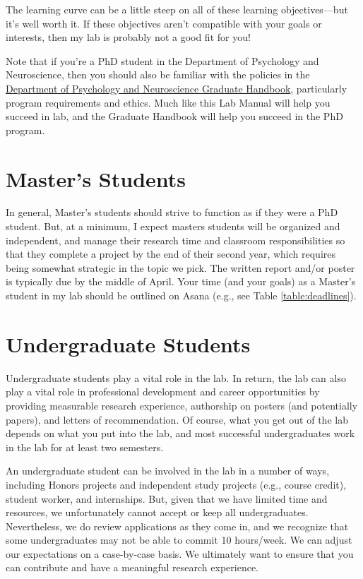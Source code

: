 \documentclass[letterpaper,11pt,oneside]{memoir}
\begin{document}
The learning curve can be a little steep on all of these learning objectives---but it's well worth it. If these objectives aren't compatible with your goals or interests, then my lab is probably not a good fit for you!

Note that if you're a PhD student in the Department of Psychology and Neuroscience, then you should also be familiar with the policies in the \href{https://docs.google.com/document/d/1hoxVN1ol7ZGB10_9N0k8yVxkRDJLcMVYGTp-Nwgbm94/edit}{Department of Psychology and Neuroscience Graduate Handbook}, particularly program requirements and ethics. Much like this Lab Manual will help you succeed in lab, and the Graduate Handbook will help you succeed in the PhD program.


\section{Master's Students}

In general, Master's students should strive to function as if they were a PhD student. But, at a minimum, I expect masters students will be organized and independent, and manage their research time and classroom responsibilities so that they complete a project by the end of their second year, which requires being somewhat strategic in the topic we pick. The written report and/or poster is typically due by the middle of April. Your time (and your goals) as a Master's student in my lab should be outlined on Asana (e.g., see Table \ref{table:deadlines}).

\section{Undergraduate Students}

Undergraduate students play a vital role in the lab. In return, the lab can also play a vital role in professional development and career opportunities by providing measurable research experience, authorship on posters (and potentially papers), and letters of recommendation. Of course, what you get out of the lab depends on what you put into the lab, and most successful undergraduates work in the lab for at least two semesters. 

An undergraduate student can be involved in the lab in a number of ways, including Honors projects and independent study projects (e.g., course credit), student worker, and internships. But, given that we have limited time and resources, we unfortunately cannot accept or keep all undergraduates. Nevertheless, we do review applications as they come in, and we recognize that some undergraduates may not be able to commit 10 hours/week. We can adjust our expectations on a case-by-case basis. We ultimately want to ensure that you can contribute and have a meaningful research experience. 
\end{document}

